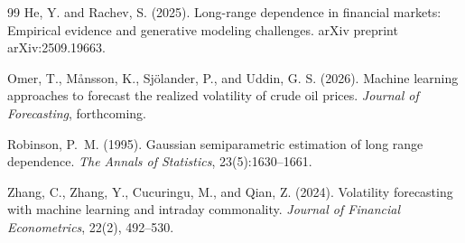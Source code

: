\documentclass[12pt,a4paper]{article}
\begin{document}
\begin{thebibliography}{99}
He, Y. and Rachev, S. (2025).
\newblock Long-range dependence in financial markets: Empirical evidence and generative modeling challenges.
\newblock arXiv preprint arXiv:2509.19663.

Omer, T., M{\aa}nsson, K., Sj{\"o}lander, P., and Uddin, G. S. (2026).
\newblock Machine learning approaches to forecast the realized volatility of crude oil prices.
\newblock \textit{Journal of Forecasting}, forthcoming.

Robinson, P.~M. (1995).
\newblock Gaussian semiparametric estimation of long range dependence.
\newblock \textit{The Annals of Statistics}, 23(5):1630--1661.

Zhang, C., Zhang, Y., Cucuringu, M., and Qian, Z. (2024).
\newblock Volatility forecasting with machine learning and intraday commonality.
\newblock \textit{Journal of Financial Econometrics}, 22(2), 492--530.

\end{thebibliography}
\end{document}
